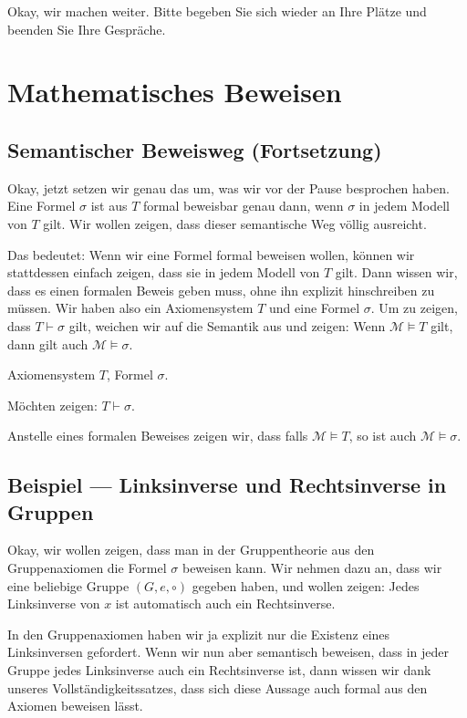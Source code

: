 \begin{spoken-clean}[00:45:10 - 00:47:10]
Okay, wir machen weiter. Bitte begeben Sie sich wieder an Ihre Plätze und beenden Sie Ihre Gespräche.
\end{spoken-clean}

\section{Mathematisches Beweisen}

\subsection{Semantischer Beweisweg (Fortsetzung)}
\begin{spoken-clean}[00:47:10 - 00:50:05]
Okay, jetzt setzen wir genau das um, was wir vor der Pause besprochen haben. Eine Formel $\sigma$ ist aus $T$ formal beweisbar genau dann, wenn $\sigma$ in jedem Modell von $T$ gilt. Wir wollen zeigen, dass dieser semantische Weg völlig ausreicht.

Das bedeutet: Wenn wir eine Formel formal beweisen wollen, können wir stattdessen einfach zeigen, dass sie in jedem Modell von $T$ gilt. Dann wissen wir, dass es einen formalen Beweis geben muss, ohne ihn explizit hinschreiben zu müssen. Wir haben also ein Axiomensystem $T$ und eine Formel $\sigma$. Um zu zeigen, dass $T \vdash \sigma$ gilt, weichen wir auf die Semantik aus und zeigen: Wenn $\mathcal{M} \models T$ gilt, dann gilt auch $\mathcal{M} \models \sigma$.
\end{spoken-clean}

\begin{math-stroke}
Axiomensystem $T$, Formel $\sigma$.

Möchten zeigen: $T \vdash \sigma$.

Anstelle eines formalen Beweises zeigen wir, dass falls $\mathcal{M} \models T$, so ist auch $\mathcal{M} \models \sigma$.
\end{math-stroke}

\subsection{Beispiel --- Linksinverse und Rechtsinverse in Gruppen}
\begin{spoken-clean}[00:50:05 - 00:53:36]
Okay, wir wollen zeigen, dass man in der Gruppentheorie aus den Gruppenaxiomen die Formel $\sigma$ beweisen kann. Wir nehmen dazu an, dass wir eine beliebige Gruppe $(G, e, \circ)$ gegeben haben, und wollen zeigen: Jedes Linksinverse von $x$ ist automatisch auch ein Rechtsinverse.

In den Gruppenaxiomen haben wir ja explizit nur die Existenz eines Linksinversen gefordert. Wenn wir nun aber semantisch beweisen, dass in jeder Gruppe jedes Linksinverse auch ein Rechtsinverse ist, dann wissen wir dank unseres Vollständigkeitssatzes, dass sich diese Aussage auch formal aus den Axiomen beweisen lässt.
\end{spoken-clean}

